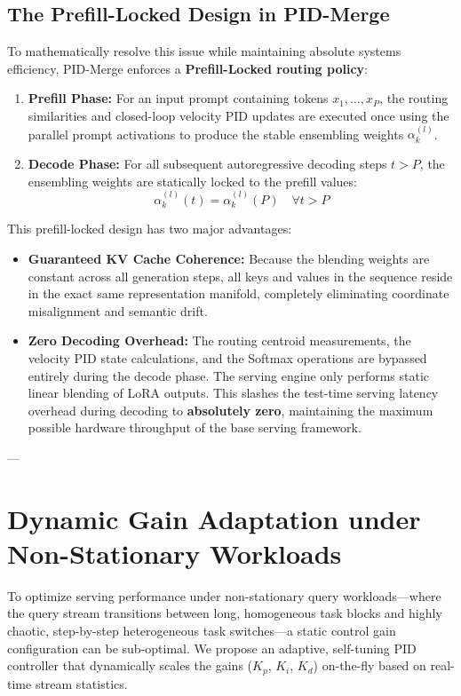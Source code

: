 \subsection{The Prefill-Locked Design in PID-Merge}
To mathematically resolve this issue while maintaining absolute systems efficiency, PID-Merge enforces a \textbf{Prefill-Locked routing policy}:
\begin{enumerate}
    \item \textbf{Prefill Phase:} For an input prompt containing tokens $x_1, \dots, x_P$, the routing similarities and closed-loop velocity PID updates are executed once using the parallel prompt activations to produce the stable ensembling weights $\alpha_k^{(l)}$.
    \item \textbf{Decode Phase:} For all subsequent autoregressive decoding steps $t > P$, the ensembling weights are statically locked to the prefill values:
    \begin{equation}
    \alpha_k^{(l)}(t) = \alpha_k^{(l)}(P) \quad \forall t > P
    \end{equation}
\end{enumerate}
This prefill-locked design has two major advantages:
\begin{itemize}
    \item \textbf{Guaranteed KV Cache Coherence:} Because the blending weights are constant across all generation steps, all keys and values in the sequence reside in the exact same representation manifold, completely eliminating coordinate misalignment and semantic drift.
    \item \textbf{Zero Decoding Overhead:} The routing centroid measurements, the velocity PID state calculations, and the Softmax operations are bypassed entirely during the decode phase. The serving engine only performs static linear blending of LoRA outputs. This slashes the test-time serving latency overhead during decoding to \textbf{absolutely zero}, maintaining the maximum possible hardware throughput of the base serving framework.
\end{itemize}

---

\section{Dynamic Gain Adaptation under Non-Stationary Workloads}
\label{sec:appendix_dynamic_gains}

To optimize serving performance under non-stationary query workloads---where the query stream transitions between long, homogeneous task blocks and highly chaotic, step-by-step heterogeneous task switches---a static control gain configuration can be sub-optimal. We propose an adaptive, self-tuning PID controller that dynamically scales the gains ($K_p$, $K_i$, $K_d$) on-the-fly based on real-time stream statistics.

